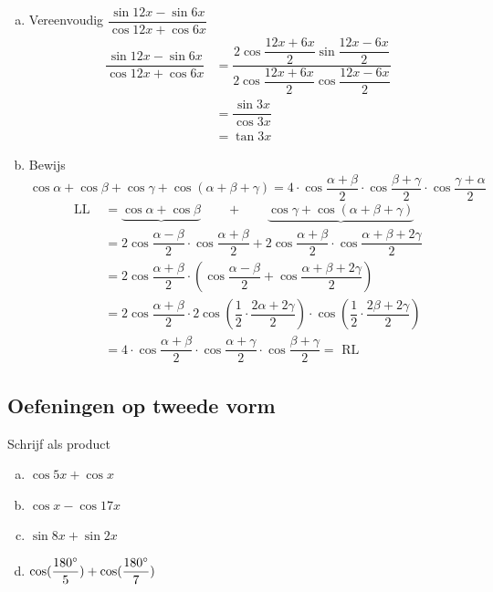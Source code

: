\documentclass[a4paper,12pt]{article}
\begin{document}
\begin{enumerate}[(a)]
  \item Vereenvoudig $\dfrac{\sin 12x - \sin 6x}{\cos 12x + \cos 6x}$
  \begin{align*}
    \dfrac{\sin 12x - \sin 6x}{\cos 12x + \cos 6x} &= \dfrac{2\cos \dfrac{12x + 6x}{2} \sin \dfrac{12x - 6x}{2}}{2\cos \dfrac{12x + 6x}{2} \cos \dfrac{12x - 6x}{2}}\\
                                                   &= \dfrac{\sin 3x}{\cos 3x}\\
                                                   &= \tan 3x
  \end{align*}
  \item Bewijs $\cos\alpha + \cos\beta + \cos\gamma + \cos(\alpha + \beta + \gamma)=4\cdot \cos\dfrac{\alpha+\beta}{2} \cdot \cos\dfrac{\beta+\gamma}{2} \cdot \cos\dfrac{\gamma+\alpha}{2}$
  \begin{align*}
    \mbox{LL } &= \underbrace{\cos\alpha + \cos\beta} \qquad + \qquad \underbrace{\cos\gamma + \cos(\alpha + \beta + \gamma)}\\
               &= 2 \cos\dfrac{\alpha-\beta}{2}\cdot\cos\dfrac{\alpha+\beta}{2}+2\cos\dfrac{\alpha+\beta}{2}\cdot\cos\dfrac{\alpha+\beta+2\gamma}{2}\\
               &= 2 \cos\dfrac{\alpha+\beta}{2}\cdot\left(\cos\dfrac{\alpha-\beta}{2} + \cos\dfrac{\alpha+\beta+2\gamma}{2}\right)\\
               &= 2 \cos\dfrac{\alpha+\beta}{2} \cdot 2 \cos\left(\dfrac{1}{2}\cdot\dfrac{2\alpha+2\gamma}{2}\right) \cdot \cos\left(\dfrac{1}{2}\cdot\dfrac{2\beta+2\gamma}{2}\right)\\
               &= 4\cdot \cos\dfrac{\alpha+\beta}{2} \cdot \cos\dfrac{\alpha+\gamma}{2} \cdot \cos\dfrac{\beta + \gamma}{2} = \mbox{ RL}
  \end{align*}
\end{enumerate}

\pagebreak
\subsection{Oefeningen op tweede vorm}

\begin{oefening}
Schrijf als product
\begin{enumerate}[(a)]
\itemsep.5em
  \item $\cos5x+\cos x$
  \item $\cos x-\cos17x$
  \item $\sin8x+\sin2x$
  \item $\cos(\dfrac{180^\circ}{5})+\cos(\dfrac{180^\circ}{7})$
\end{enumerate}
\end{oefening}
\end{document}
